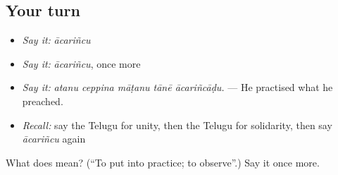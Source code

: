 \subsection*{Your turn}
\begin{itemize}
\raggedright
  \item \emph{Say it:} \emph{ācariñcu}
  \item \emph{Say it:} \emph{ācariñcu}, once more
  \item \emph{Say it:} \emph{atanu ceppina māṭanu tānē ācariñcāḍu.} — He practised what he preached.
  \item \emph{Recall:} say the Telugu for unity, then the Telugu for solidarity, then say \emph{ācariñcu} again
\end{itemize}

\begin{tcolorbox}[breakable,colback=teal!4,colframe=teal!35!black,title={Before you move on}]
What does  mean? (\textquotedblleft{}To put into practice; to observe\textquotedblright{}.) Say it once more.
\end{tcolorbox}
